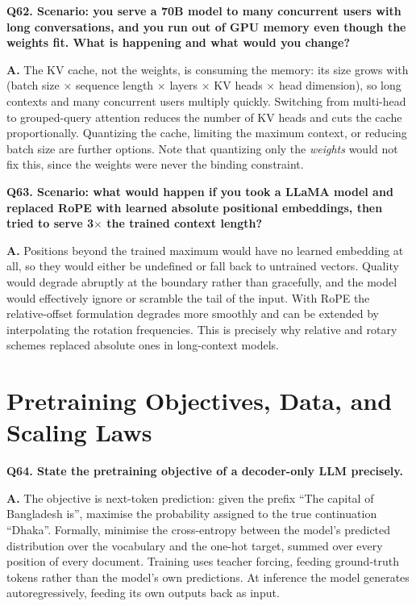 \documentclass[11pt]{article}
\begin{document}
\medskip
\noindent\textbf{Q62. Scenario: you serve a 70B model to many concurrent users with long conversations, and you run out of GPU memory even though the weights fit. What is happening and what would you change?}

\noindent\textbf{A.} The KV cache, not the weights, is consuming the memory: its size grows with (batch size $\times$ sequence length $\times$ layers $\times$ KV heads $\times$ head dimension), so long contexts and many concurrent users multiply quickly. Switching from multi-head to grouped-query attention reduces the number of KV heads and cuts the cache proportionally. Quantizing the cache, limiting the maximum context, or reducing batch size are further options. Note that quantizing only the \emph{weights} would not fix this, since the weights were never the binding constraint.

\medskip
\noindent\textbf{Q63. Scenario: what would happen if you took a LLaMA model and replaced RoPE with learned absolute positional embeddings, then tried to serve 3$\times$ the trained context length?}

\noindent\textbf{A.} Positions beyond the trained maximum would have no learned embedding at all, so they would either be undefined or fall back to untrained vectors. Quality would degrade abruptly at the boundary rather than gracefully, and the model would effectively ignore or scramble the tail of the input. With RoPE the relative-offset formulation degrades more smoothly and can be extended by interpolating the rotation frequencies. This is precisely why relative and rotary schemes replaced absolute ones in long-context models.

\section{Pretraining Objectives, Data, and Scaling Laws}

\noindent\textbf{Q64. State the pretraining objective of a decoder-only LLM precisely.}

\noindent\textbf{A.} The objective is next-token prediction: given the prefix ``The capital of Bangladesh is'', maximise the probability assigned to the true continuation ``Dhaka''. Formally, minimise the cross-entropy between the model's predicted distribution over the vocabulary and the one-hot target, summed over every position of every document. Training uses teacher forcing, feeding ground-truth tokens rather than the model's own predictions. At inference the model generates autoregressively, feeding its own outputs back as input.
\end{document}
